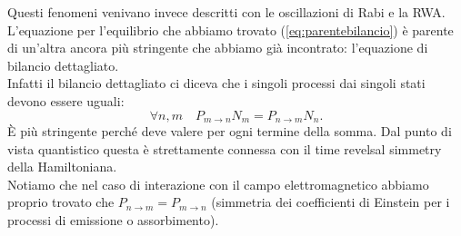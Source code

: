 Questi fenomeni venivano invece descritti con le oscillazioni di Rabi e la RWA.\\
L'equazione per l'equilibrio che abbiamo trovato (\ref{eq:parentebilancio}) è parente di un'altra ancora più stringente che abbiamo già incontrato: l'equazione di bilancio dettagliato.\\
Infatti il bilancio dettagliato ci diceva che i singoli processi dai singoli stati devono essere uguali:
\[
\forall n,m \quad P_{m\to n}N_m = P_{n\to m}N_n 
.\] 
È più stringente perché deve valere per ogni termine della somma. Dal punto di vista quantistico questa è strettamente connessa con il time revelsal simmetry della Hamiltoniana.\\
Notiamo che nel caso di interazione con il campo elettromagnetico abbiamo proprio trovato che $P_{n\to m}=P_{m\to n}$ (simmetria dei coefficienti di Einstein per i processi di emissione o assorbimento).
